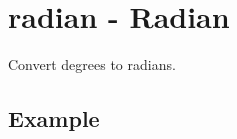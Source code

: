 
%

\section{radian - Radian\label{sect:radian}}
Convert degrees to radians. 

\subsection*{Example}


%

